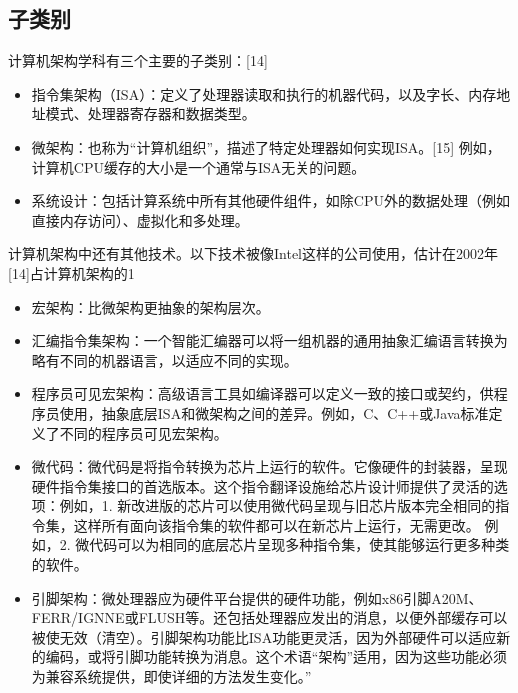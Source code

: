 \subsection{子类别}  
计算机架构学科有三个主要的子类别：[14]
\begin{itemize}
\item 指令集架构（ISA）：定义了处理器读取和执行的机器代码，以及字长、内存地址模式、处理器寄存器和数据类型。
\item 微架构：也称为“计算机组织”，描述了特定处理器如何实现ISA。[15] 例如，计算机CPU缓存的大小是一个通常与ISA无关的问题。
\item 系统设计：包括计算系统中所有其他硬件组件，如除CPU外的数据处理（例如直接内存访问）、虚拟化和多处理。
\end{itemize}
计算机架构中还有其他技术。以下技术被像Intel这样的公司使用，估计在2002年[14]占计算机架构的1%
\begin{itemize}
\item 宏架构：比微架构更抽象的架构层次。
\item 汇编指令集架构：一个智能汇编器可以将一组机器的通用抽象汇编语言转换为略有不同的机器语言，以适应不同的实现。
\item 程序员可见宏架构：高级语言工具如编译器可以定义一致的接口或契约，供程序员使用，抽象底层ISA和微架构之间的差异。例如，C、C++或Java标准定义了不同的程序员可见宏架构。
\item 微代码：微代码是将指令转换为芯片上运行的软件。它像硬件的封装器，呈现硬件指令集接口的首选版本。这个指令翻译设施给芯片设计师提供了灵活的选项：例如，1. 新改进版的芯片可以使用微代码呈现与旧芯片版本完全相同的指令集，这样所有面向该指令集的软件都可以在新芯片上运行，无需更改。 例如，2. 微代码可以为相同的底层芯片呈现多种指令集，使其能够运行更多种类的软件。
\item 引脚架构：微处理器应为硬件平台提供的硬件功能，例如x86引脚A20M、FERR/IGNNE或FLUSH等。还包括处理器应发出的消息，以便外部缓存可以被使无效（清空）。引脚架构功能比ISA功能更灵活，因为外部硬件可以适应新的编码，或将引脚功能转换为消息。这个术语“架构”适用，因为这些功能必须为兼容系统提供，即使详细的方法发生变化。”
\end{itemize}